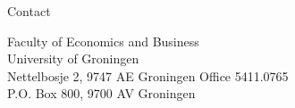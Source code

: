 \documentclass{resume} %
\begin{document}

\begin{rSection}{Contact}


Faculty of Economics and Business\\ University of Groningen \\
Nettelbosje 2, 9747 AE Groningen Office 5411.0765\\   
P.O. Box 800, 9700 AV  Groningen 
\end{rSection}
\end{document}
